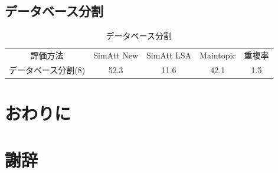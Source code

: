 \documentclass[master]{suribt}
\theoremstyle{definition}
\begin{document}
 \section{データベース分割}

 \begin{table}[!hbp]
 \center
 \begin{tabular}{|c|c|c|c|c|}
 \hline
 評価方法  & SimAtt New & SimAtt LSA  & Maintopic & 重複率  \\
 データベース分割(8)  & 52.3 & 11.6 & 42.1 & 1.5 \\
 \hline
 \end{tabular}
 \caption{データベース分割}
 \end{table}



 \chapter{おわりに}

 \backmatter%
 \chapter{謝辞}%


  \appendix%
  \chapter{}
  
\end{document}
